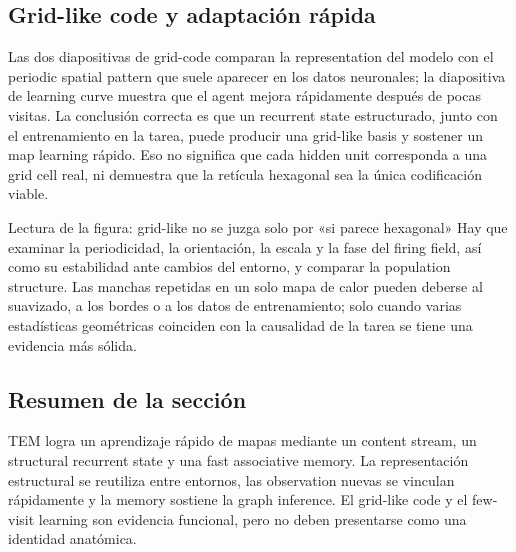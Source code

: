 \subsection{Grid-like code y adaptación rápida}

Las dos diapositivas de grid-code comparan la representation del modelo con el periodic spatial pattern que suele aparecer en los datos neuronales; la diapositiva de learning curve muestra que el agent mejora rápidamente después de pocas visitas. La conclusión correcta es que un recurrent state estructurado, junto con el entrenamiento en la tarea, puede producir una grid-like basis y sostener un map learning rápido. Eso no significa que cada hidden unit corresponda a una grid cell real, ni demuestra que la retícula hexagonal sea la única codificación viable.




\begin{knowledgebox}{Lectura de la figura: grid-like no se juzga solo por «si parece hexagonal»}
Hay que examinar la periodicidad, la orientación, la escala y la fase del firing field, así como su estabilidad ante cambios del entorno, y comparar la population structure. Las manchas repetidas en un solo mapa de calor pueden deberse al suavizado, a los bordes o a los datos de entrenamiento; solo cuando varias estadísticas geométricas coinciden con la causalidad de la tarea se tiene una evidencia más sólida.
\end{knowledgebox}

\subsection{Resumen de la sección}

TEM logra un aprendizaje rápido de mapas mediante un content stream, un structural recurrent state y una fast associative memory. La representación estructural se reutiliza entre entornos, las observation nuevas se vinculan rápidamente y la memory sostiene la graph inference. El grid-like code y el few-visit learning son evidencia funcional, pero no deben presentarse como una identidad anatómica.
